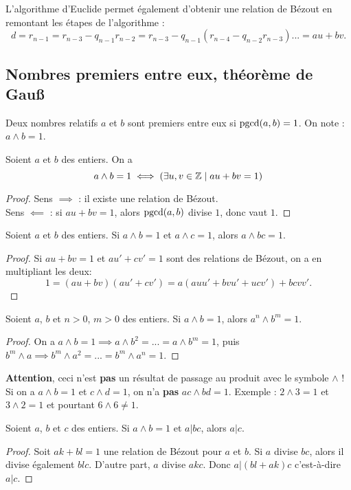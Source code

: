L'algorithme d'Euclide permet également d'obtenir une relation de Bézout en \og remontant \fg{} les étapes de l'algorithme : 
\[ d = r_{n-1} = r_{n-3} - q_{n-1}r_{n-2} = r_{n-3} - q_{n-1}(r_{n-4} - q_{n-2}r_{n-3})... = au+bv.\]

\subsection{Nombres premiers entre eux, théorème de Gau{\ss}}

\begin{definition}
Deux nombres relatifs $a$ et $b$ sont premiers entre eux si $\operatorname{pgcd}(a,b)=1$. On note :  $a\wedge b = 1$.
\end{definition}

\begin{proposition} Soient $a$ et $b$ des entiers. On a 
\[
a\wedge b = 1 \iff \left(\exists u, v\in \mathbb{Z}\mid au+bv=1\right)
\]
\end{proposition}
\begin{proof}
Sens $\implies$ : il existe une relation de Bézout.\\
Sens $\impliedby$ : si $au+bv=1$, alors  $\operatorname{pgcd}(a,b)$ divise $1$, donc vaut $1$.
\end{proof}

\begin{proposition}
Soient $a$ et $b$ des entiers.
Si $a\wedge b = 1$ et $a\wedge c = 1$, alors $a\wedge bc=1$.
\end{proposition}
\begin{proof}
Si $au+bv=1$ et $au'+cv'=1$ sont des relations de Bézout, on a en multipliant les deux:
\[ 1 = (au+bv)(au'+cv') = a(auu'+bvu'+ucv')+bcvv'.\]
\end{proof}
\begin{corollaire}
Soient $a$, $b$ et $n>0$, $m>0$ des entiers.
Si $a\wedge b = 1$, alors $a^n\wedge b^m=1$.
\end{corollaire}
\begin{proof}
On a $a\wedge b = 1 \implies a\wedge b^2= ... =  a\wedge b^m=1$, puis $b^m\wedge a  \implies b^m\wedge a^2 = ... = b^m\wedge a^n=1$.
\end{proof}

\textbf{Attention}, ceci n'est \textbf{pas} un résultat de passage au produit avec le symbole $\wedge$ ! Si on a $a\wedge b = 1$ et $c\wedge d = 1$, on n'a \textbf{pas} $ac\wedge bd=1$. Exemple  : $2\wedge 3=1$ et $3\wedge 2=1$ et pourtant $6\wedge 6\neq 1$.

\begin{theoreme}
Soient $a$, $b$ et $c$ des entiers.
Si $a\wedge b = 1$ et $a|bc$, alors $a|c$.
\end{theoreme}
\begin{proof}
Soit $ak+bl=1$ une relation de Bézout pour $a$ et $b$.
Si $a$ divise $bc$, alors il divise également $blc$. D'autre part, $a$ divise $akc$. Donc $a | (bl+ak)c$ c'est-à-dire $a|c$.
\end{proof}


